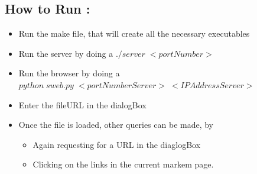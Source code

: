 \documentclass[10pt]{article}
\begin{document}
\subsection{\color{Violet}How to Run : }
\begin{itemize}
 \item  Run the make file, that will create all the necessary executables
\item Run the server by doing a \textbf{$./server \; <portNumber> $}
\item Run the browser by doing a \textbf{$python \; sweb.py \; <portNumberServer> \; <IPAddressServer>$}
\item Enter the fileURL in the dialogBox
\item Once the file is loaded, other queries can be made, by 
\begin{itemize}
 \item Again requesting for a URL in the diaglogBox
  \item Clicking on the links in the current markem page.
\end{itemize}

\end{itemize}
\end{document}
